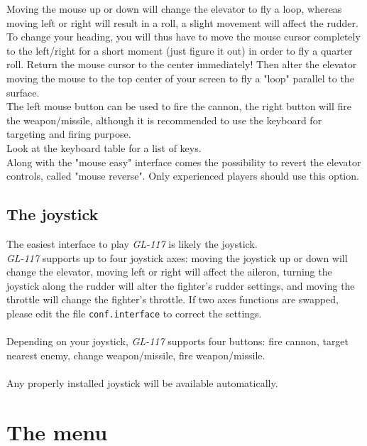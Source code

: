 Moving the mouse up or down will change the elevator to fly a loop, whereas
moving left or right will result in a roll, a slight movement will
affect the rudder.\\
To change your heading, you will thus have to move the mouse cursor completely
to the left/right for a short moment (just figure it out) in order to fly a
quarter roll. Return the mouse cursor to the center immediately!
Then alter the elevator moving the mouse to the top center of your screen to
fly a "loop" parallel to the surface.\\
The left mouse button can be used to fire the cannon, the right button will
fire the weapon/missile, although it is recommended to use the keyboard for
targeting and firing purpose.\\
Look at the keyboard table for a list of keys.\\
Along with the "mouse easy" interface comes the possibility to revert the
elevator controls, called "mouse reverse". Only experienced players should
use this option.


\subsection{The joystick}
\label{subsec:joystick}

The easiest interface to play \emph{GL-117} is likely the joystick.\\
\emph{GL-117} supports up to four joystick axes:
moving the joystick up or down will change the elevator, moving left or right
will affect the aileron, turning the joystick along the rudder will alter
the fighter's rudder settings, and moving the throttle will change
the fighter's throttle. If two axes functions are swapped, please edit the file
\texttt{conf.interface} to correct the settings.\\\\
Depending on your joystick, \emph{GL-117} supports four buttons:
fire cannon, target nearest enemy, change weapon/missile, fire weapon/missile.\\\\
Any properly installed joystick will be available automatically.


\section{The menu}
\label{sec:menu}

